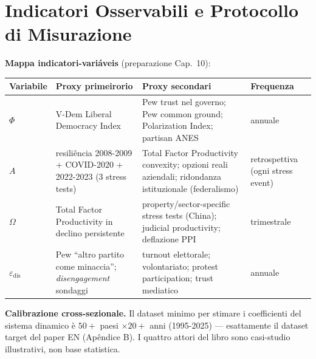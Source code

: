 \section{Indicatori Osservabili e Protocollo di
Misurazione}\label{indicatori-osservabili-e-protocollo-di-medição}

\Proved{} \textbf{Mappa indicatori-variáveis} (preparazione Cap.~10):

{\def\LTcaptype{none} %
{\small\begin{longtable}[]{@{}
  >{\raggedright\arraybackslash}p{}
  >{\raggedright\arraybackslash}p{}
  >{\raggedright\arraybackslash}p{}
  >{\raggedright\arraybackslash}p{}@{}}
\toprule\noalign{}
\begin{minipage}[b]{\linewidth}\raggedright
Variabile
\end{minipage} & \begin{minipage}[b]{\linewidth}\raggedright
Proxy primeirorio
\end{minipage} & \begin{minipage}[b]{\linewidth}\raggedright
Proxy secondari
\end{minipage} & \begin{minipage}[b]{\linewidth}\raggedright
Frequenza
\end{minipage} \\
\midrule\noalign{}
\endhead
\bottomrule\noalign{}
\endlastfoot
\(\Phi\) & V-Dem Liberal Democracy Index & Pew trust nel governo; Pew
common ground; Polarization Index; partisan ANES & annuale \\
\(A\) & resiliência 2008-2009 + COVID-2020 + 2022-2023 (3 stress tests) &
Total Factor Productivity convexity; opzioni reali aziendali; ridondanza
istituzionale (federalismo) & retrospettiva (ogni stress event) \\
\(\Omega\) & Total Factor Productivity in declino persistente &
property/sector-specific stress tests (China); judicial productivity;
deflazione PPI & trimestrale \\
\(\varepsilon_{\text{dis}}\) & Pew ``altro partito come minaccia'';
\emph{disengagement} sondaggi & turnout elettorale; volontariato;
protest participation; trust mediatico & annuale \\
\end{longtable}}
}

\Hypoth{} \textbf{Calibrazione cross-sezionale.} Il dataset minimo per
stimare i coefficienti del sistema dinamico è \(50+\) paesi
\(\times 20+\) anni (1995-2025) --- esattamente il dataset target del
paper EN (Apêndice B). I quattro attori del libro sono casi-studio
illustrativi, non base statistica.

